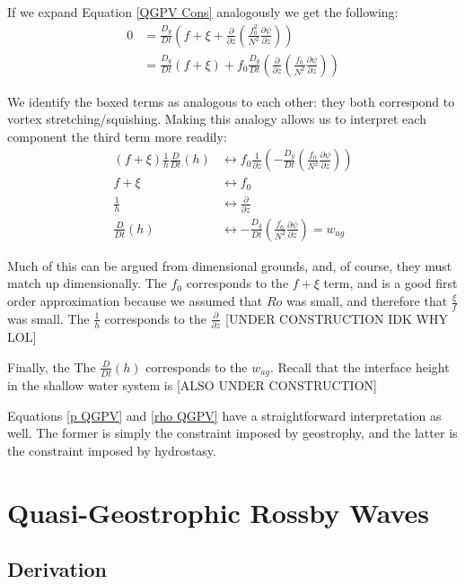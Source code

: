 If we expand Equation \ref{QGPV Cons} analogously we get the following:
\begin{align*}
    0 &= \frac{D_g}{Dt}\left( f+\xi +  \frac{\partial }{\partial z}\left( \frac{f_0^2}{N^2} \frac{\partial \psi}{\partial z} \right)\right)
    \\
    &=\frac{D_g}{Dt}(f+\xi) + \boxed{f_0 \frac{D_g}{Dt}\left( \frac{\partial }{\partial z}\left( \frac{f_0}{N^2} \frac{\partial \psi}{\partial z} \right)\right)}
\end{align*}

We identify the boxed terms as analogous to each other: they both correspond to vortex stretching/squishing. Making this analogy allows us to interpret each component the third term more readily:
\begin{align*}
    (f+\xi)\frac{1}{h}\frac{D}{Dt}(h) & \longleftrightarrow
    f_0\frac{1}{\partial z}\left( -\frac{D_g}{Dt}\left( \frac{f_0}{N^2} \frac{\partial \psi}{\partial z}\right) \right)
    \\
    f+\xi & \longleftrightarrow f_0
    \\
    \frac{1}{h} & \longleftrightarrow \frac{\partial}{\partial z}
    \\
    \frac{D}{Dt}(h) & \longleftrightarrow -\frac{D_g}{Dt}\left( \frac{f_0}{N^2} \frac{\partial \psi}{\partial z}\right)=w_{ag}
\end{align*}

Much of this can be argued from dimensional grounds, and, of course, they must match up dimensionally. The $f_0$ corresponds to the $f+\xi$ term, and is a good first order approximation because we assumed that $Ro$ was small, and therefore that $\frac{\xi}{f}$ was small. The $\frac{1}{h}$ corresponds to the $\frac{\partial}{\partial z}$ [UNDER CONSTRUCTION IDK WHY LOL]

Finally, the The $\frac{D}{Dt}(h)$ corresponds to the $w_{ag}$. Recall that the interface height in the shallow water system is [ALSO UNDER CONSTRUCTION]

Equations \ref{p QGPV} and \ref{rho QGPV} have a straightforward interpretation as well. The former is simply the constraint imposed by geostrophy, and the latter is the constraint imposed by hydrostasy.


\section{Quasi-Geostrophic Rossby Waves}

\subsection{Derivation}


